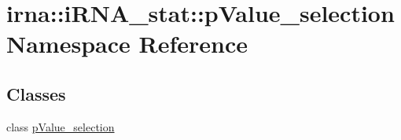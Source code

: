 \hypertarget{namespaceirna_1_1iRNA__stat_1_1pValue__selection}{
\section{irna\-:\-:i\-R\-N\-A\-\_\-stat\-:\-:p\-Value\-\_\-selection \-Namespace \-Reference}
\label{namespaceirna_1_1iRNA__stat_1_1pValue__selection}
}
\subsection*{\-Classes}
\begin{DoxyCompactItemize}
\item 
class \hyperlink{classirna_1_1iRNA__stat_1_1pValue__selection_1_1pValue__selection}{p\-Value\-\_\-selection}
\end{DoxyCompactItemize}
